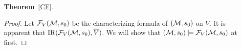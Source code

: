 \documentclass{article}
\begin{document}
\textbf{Theorem}~\ref{CF}.
\begin{proof}
%

Let ${\cal F}_V({\cal M}, s_0)$ be the characterizing formula of $({\cal M}, s_0)$ on $V$.
It is apparent that $\textrm{IR}({\cal F}_V({\cal M}, s_0), \overline V)$. We will show that $({\cal M}, s_0) \models {\cal F}_V({\cal M}, s_0)$ at first.


\end{proof}
\end{document}
